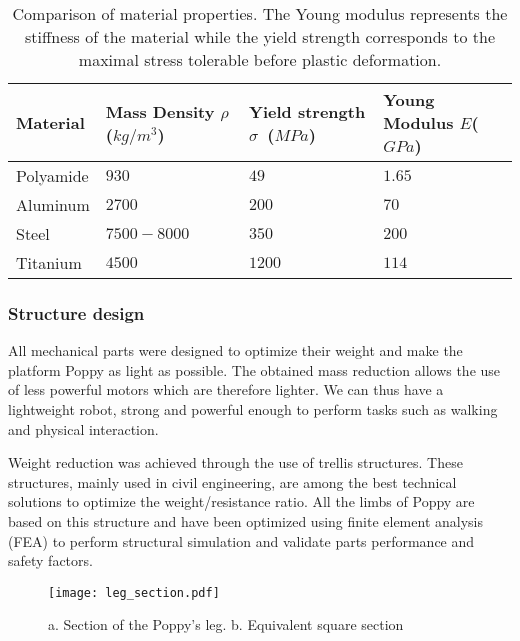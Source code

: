 \begin{table}[h]
    \centering
    \begin{tabularx}{0.8\linewidth }{l X X X}
        Material & Mass Density $\rho$ ($kg/m^3$) &  Yield strength $\sigma$~($MPa$) & Young Modulus $E$($GPa$)\\
        \hline
        Polyamide & $930$ & $49$ & $1.65$\\

        Aluminum & $2700$ & $200$ & $70$\\

        Steel & $7500-8000$ & $350$ & $200$\\

        Titanium & $4500$ & $1200$ & $114$\\

    \end{tabularx}

    \caption{Comparison of material properties. The Young modulus represents the stiffness of the material while the yield strength corresponds to the maximal stress tolerable before plastic deformation.}
    \label{tab:materials}
\end{table}




\subsubsection{Structure design} %
\label{ssub:structure_design}


All mechanical parts were designed to optimize their weight and make the platform Poppy as light as possible. The obtained mass reduction allows the use of less powerful motors which are therefore lighter. We can thus have a lightweight robot, strong and powerful enough to perform tasks such as walking and physical interaction.

Weight reduction was achieved through the use of trellis structures. These structures, mainly used in civil engineering, are among the best technical solutions to optimize the weight/resistance ratio. All the limbs of Poppy are based on this structure and have been optimized using finite element analysis (FEA) to perform structural simulation and validate parts performance and safety factors.

\begin{figure}[thpb]
    \centering
    \texttt{[image: leg\_section.pdf]}
    \caption{a. Section of the Poppy's leg. b. Equivalent square section}
    \label{fig:leg_section}
\end{figure}



